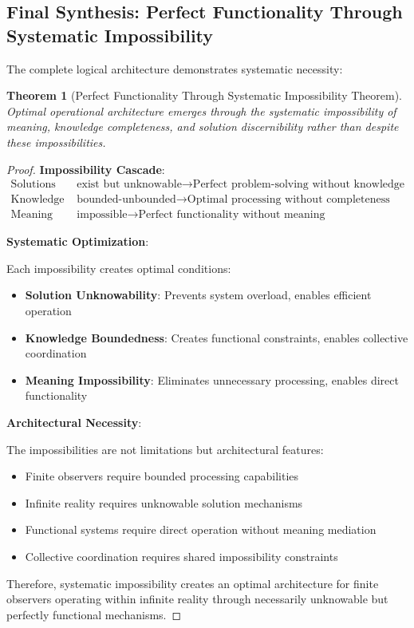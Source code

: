 \documentclass[12pt,a4paper]{article}
\newtheorem{theorem}{Theorem}[section]
\begin{document}
\subsection{Final Synthesis: Perfect Functionality Through Systematic Impossibility}

The complete logical architecture demonstrates systematic necessity:

\begin{theorem}[Perfect Functionality Through Systematic Impossibility Theorem]
Optimal operational architecture emerges through the systematic impossibility of meaning, knowledge completeness, and solution discernibility rather than despite these impossibilities.
\end{theorem}

\begin{proof}
\textbf{Impossibility Cascade}:
\begin{align}
\text{Solutions} &\text{ exist but unknowable} \rightarrow \text{Perfect problem-solving without knowledge} \\
\text{Knowledge} &\text{ bounded-unbounded} \rightarrow \text{Optimal processing without completeness} \\
\text{Meaning} &\text{ impossible} \rightarrow \text{Perfect functionality without meaning}
\end{align}

\textbf{Systematic Optimization}:

Each impossibility creates optimal conditions:
\begin{itemize}
\item \textbf{Solution Unknowability}: Prevents system overload, enables efficient operation
\item \textbf{Knowledge Boundedness}: Creates functional constraints, enables collective coordination
\item \textbf{Meaning Impossibility}: Eliminates unnecessary processing, enables direct functionality
\end{itemize}

\textbf{Architectural Necessity}:

The impossibilities are not limitations but architectural features:
\begin{itemize}
\item Finite observers require bounded processing capabilities
\item Infinite reality requires unknowable solution mechanisms
\item Functional systems require direct operation without meaning mediation
\item Collective coordination requires shared impossibility constraints
\end{itemize}

Therefore, systematic impossibility creates an optimal architecture for finite observers operating within infinite reality through necessarily unknowable but perfectly functional mechanisms.
\end{proof}
\end{document}
